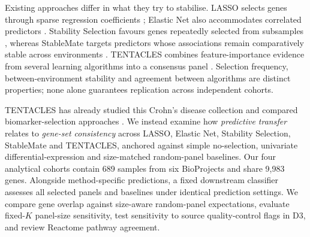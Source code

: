 Existing approaches differ in what they try to stabilise. LASSO selects genes through sparse regression coefficients \cite{tibshirani1996lasso}; Elastic Net also accommodates correlated predictors \cite{zou2005elastic}. Stability Selection favours genes repeatedly selected from subsamples \cite{meinshausen2010stability}, whereas StableMate targets predictors whose associations remain comparatively stable across environments \cite{deng2024stablemate}. TENTACLES combines feature-importance evidence from several learning algorithms into a consensus panel \cite{montesi2026tentacles}. Selection frequency, between-environment stability and agreement between algorithms are distinct properties; none alone guarantees replication across independent cohorts.

TENTACLES has already studied this Crohn's disease collection and compared biomarker-selection approaches \cite{montesi2026tentacles}. We instead examine how \emph{predictive transfer} relates to \emph{gene-set consistency} across LASSO, Elastic Net, Stability Selection, StableMate and TENTACLES, anchored against simple no-selection, univariate differential-expression and size-matched random-panel baselines. Our four analytical cohorts contain 689 samples from six BioProjects and share 9,983 genes. Alongside method-specific predictions, a fixed downstream classifier assesses all selected panels and baselines under identical prediction settings. We compare gene overlap against size-aware random-panel expectations, evaluate fixed-$K$ panel-size sensitivity, test sensitivity to source quality-control flags in D3, and review Reactome pathway agreement.
